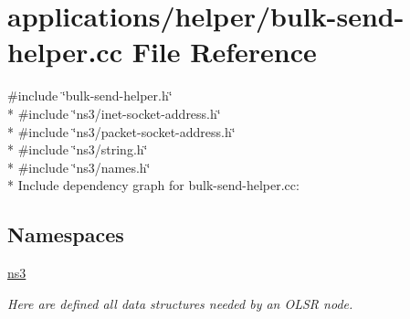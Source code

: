 \hypertarget{bulk-send-helper_8cc}{}\section{applications/helper/bulk-\/send-\/helper.cc File Reference}
\label{bulk-send-helper_8cc}
{\ttfamily \#include \char`\"{}bulk-\/send-\/helper.\+h\char`\"{}}\\*
{\ttfamily \#include \char`\"{}ns3/inet-\/socket-\/address.\+h\char`\"{}}\\*
{\ttfamily \#include \char`\"{}ns3/packet-\/socket-\/address.\+h\char`\"{}}\\*
{\ttfamily \#include \char`\"{}ns3/string.\+h\char`\"{}}\\*
{\ttfamily \#include \char`\"{}ns3/names.\+h\char`\"{}}\\*
Include dependency graph for bulk-\/send-\/helper.cc\+:
\subsection*{Namespaces}
\begin{DoxyCompactItemize}
\item 
 \hyperlink{namespacens3}{ns3}
\begin{DoxyCompactList}\small\item\em Here are defined all data structures needed by an O\+L\+SR node. \end{DoxyCompactList}\end{DoxyCompactItemize}
